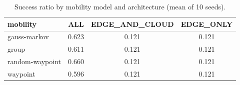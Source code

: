 \begin{table}[t]
\centering
\footnotesize
\caption{Success ratio by mobility model and architecture (mean of 10 seeds).}
\label{tab:p1-mobility}
\begin{tabular}{lccc}
\toprule
mobility & ALL & EDGE\_AND\_CLOUD & EDGE\_ONLY \\
\midrule
gauss-markov & 0.623 & 0.121 & 0.121 \\
group & 0.611 & 0.121 & 0.121 \\
random-waypoint & 0.660 & 0.121 & 0.121 \\
waypoint & 0.596 & 0.121 & 0.121 \\
\bottomrule
\end{tabular}
\par\vspace{2pt}{\footnotesize\raggedright Models: random waypoint, Gauss--Markov, fixed waypoints, reference-point group.\par}
\end{table}
